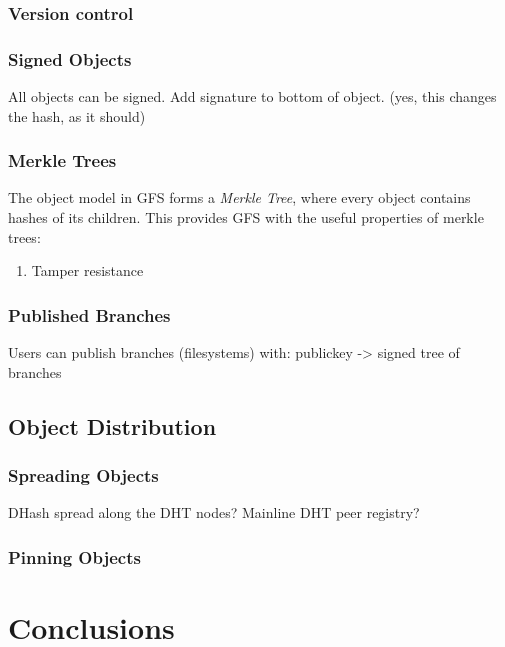 \documentclass{sig-alternate}
\begin{document}
\subsubsection{Version control}

\subsubsection{Signed Objects}

All objects can be signed. Add signature to bottom of object.
(yes, this changes the hash, as it should)

\subsubsection{Merkle Trees}

The object model in GFS forms a \textit{Merkle Tree}, where every object
contains hashes of its children. This provides GFS with the useful properties
of merkle trees:

\begin{enumerate}
  \item Tamper resistance
\end{enumerate}

\subsubsection{Published Branches}

Users can publish branches (filesystems) with:
publickey -> signed tree of branches


\subsection{Object Distribution}

\subsubsection{Spreading Objects}

DHash spread along the DHT nodes?
Mainline DHT peer registry?

\subsubsection{Pinning Objects}


\section{Conclusions}






%
%
\end{document}
